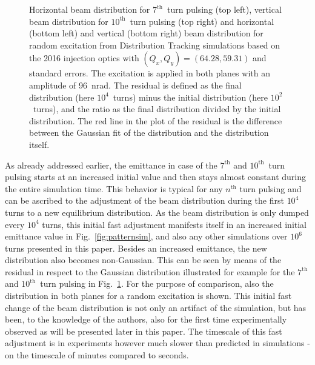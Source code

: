 \documentclass[%
 reprint,
 amsmath,amssymb,
 aps,
prstab,
]{revtex4-1}
\begin{document}
\begin{figure}[t]
\begin{minipage}[t]{0.49\linewidth}
	\end{minipage}	
	\caption{\label{fig:patternhist} Horizontal beam distribution for $7^{\mathrm{th}}$~turn pulsing (top left), vertical beam distribution for $10^{\mathrm{th}}$~turn pulsing (top right) and horizontal (bottom left) and vertical (bottom right) beam distribution for random excitation from Distribution Tracking simulations based on the 2016 injection optics with $(Q_x,Q_y)=(64.28,59.31)$ and standard errors. The excitation is applied in both planes with an amplitude of 96~nrad. The residual is defined as the final distribution (here $10^4$~turns) minus the initial distribution (here $10^2$~turns), and the ratio as the final distribution divided by the initial distribution. The red line in the plot of the residual is the difference between the Gaussian fit of the distribution and the distribution itself.}
\end{figure}

As already addressed earlier, the emittance in case of the $7^{\mathrm{th}}$ and $10^{\mathrm{th}}$~turn pulsing starts at an increased initial value and then stays almost constant during the entire simulation time. This behavior is typical for any $n^{\mathrm{th}}$ turn pulsing and can be ascribed to the adjustment of the beam distribution during the first $10^4$ turns to a new equilibrium distribution. As the beam distribution is only dumped every $10^4$ turns, this initial fast adjustment manifests itself in an increased initial emittance value in Fig.~\ref{fig:patternsim}, and also any other simulations over $10^6$ turns presented in this paper. Besides an increased emittance, the new distribution also becomes non-Gaussian. This can be seen by means of the residual in respect to the Gaussian distribution illustrated for example for the $7^{\mathrm{th}}$ and $10^{\mathrm{th}}$~turn pulsing in Fig.~\ref{fig:patternhist}. For the purpose of comparison, also the distribution in both planes for a random excitation is shown. This initial fast change of the beam distribution is not only an artifact of the simulation, but has been, to the knowledge of the authors, also for the first time experimentally observed as will be presented later in this paper. The timescale of this fast adjustment is in experiments however much slower than predicted in simulations - on the timescale of minutes compared to seconds. 
\end{document}
